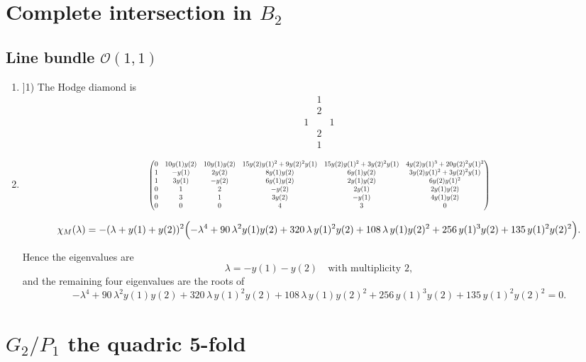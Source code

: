 \documentclass[11pt]{amsart}
\newcounter{num}[section] %
\begin{document}
\section{Complete intersection in $B_2$}

\subsection{Line bundle $\mathcal{O}(1,1)$}


\begin{enumerate}
    \item ]1) The Hodge diamond is
\[
        \begin{array}{ccc}
             &1&  \\
             &2&\\
             1&&1\\
             &2&\\
             &1&
        \end{array}
  \]
\item[2)]  \[
  \resizebox{\textwidth}{!}{$
\begin{pmatrix}
0 & 10y(1)y(2) & 10y(1)y(2) & 15y(2)y(1)^2+9y(2)^2y(1) & 15y(2)y(1)^2+3y(2)^2y(1) & 4y(2)y(1)^3+20y(2)^2y(1)^2 \\
1 & -y(1) & 2y(2) & 8y(1)y(2) & 6y(1)y(2) & 3y(2)y(1)^2+3y(2)^2y(1) \\
1 & 3y(1) & -y(2) & 6y(1)y(2) & 2y(1)y(2) & 6y(2)y(1)^2 \\
0 & 1 & 2 & -y(2) & 2y(1) & 2y(1)y(2) \\
0 & 3 & 1 & 3y(2) & -y(1) & 4y(1)y(2) \\
0 & 0 & 0 & 4 & 3 & 0
\end{pmatrix}
$}
\]

\[
\chi_M(\lambda)
=
-(\lambda+y(1)+y(2))^2
\Bigl(
-\lambda^4
+90\,\lambda^2 y(1)y(2)
+320\,\lambda\, y(1)^2y(2)
+108\,\lambda\, y(1)y(2)^2
+256\,y(1)^3y(2)
+135\,y(1)^2y(2)^2
\Bigr).
\]

Hence the eigenvalues are
\[
\lambda=-y(1)-y(2)
\quad\text{with multiplicity }2,
\]
and the remaining four eigenvalues are the roots of
\[
-\lambda^4
+90\,\lambda^2 y(1)y(2)
+320\,\lambda\, y(1)^2y(2)
+108\,\lambda\, y(1)y(2)^2
+256\,y(1)^3y(2)
+135\,y(1)^2y(2)^2
=0.
\]
\end{enumerate}


\section{$G_2/P_1$ the quadric 5-fold}
\end{document}
